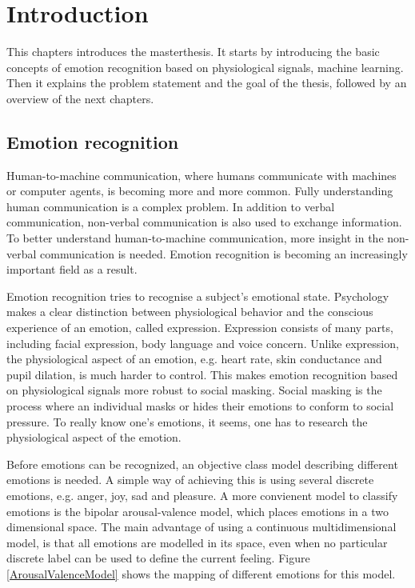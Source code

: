 \chapter{Introduction}
{\samenvatting This chapters introduces the masterthesis. It starts by introducing the basic concepts of emotion recognition based on physiological signals, machine learning. Then it explains the problem statement and the goal of the thesis, followed by an overview of the next chapters.}

\section{Emotion recognition}

Human-to-machine communication, where humans communicate with machines or computer agents, is becoming more and more common\citep{hummaccom}. Fully understanding human communication is a complex problem. In addition to verbal communication, non-verbal communication is also used to exchange information\citep{EmotionRelativePower}. To better understand human-to-machine communication, more insight in the non-verbal communication is needed. Emotion recognition is becoming an increasingly important field as a result\citep{RealTimeEEGEmotion}.

\npar 

Emotion recognition tries to recognise a subject's emotional state. Psychology makes a clear distinction between physiological behavior and the conscious experience of an emotion, called expression\cite{ExtendedPaper}. Expression consists of many parts, including facial expression, body language and voice concern\citep{EMSpeech}. Unlike expression, the physiological aspect of an emotion, e.g. heart rate, skin conductance and pupil dilation, is much harder to control. This makes emotion recognition based on physiological signals more robust to social masking\citep{PhytoEm}. Social masking is the process where an individual masks or hides their emotions to conform to social pressure. To really know one's emotions, it seems, one has to research the physiological aspect of the emotion.

\npar

\label{valarrdomspace}
Before emotions can be recognized, an objective class model describing different emotions is needed. A simple way of achieving this is using several discrete emotions, e.g. anger, joy, sad and pleasure. A more convienent model to classify emotions is the bipolar arousal-valence model\cite{ExtendedPaper,RealTimeEEGEmotion}, which places emotions in a two dimensional space. The main advantage of using a continuous multidimensional model, is that all emotions are modelled in its space, even when no particular discrete label can be used to define the current feeling. Figure \ref{ArousalValenceModel} shows the mapping of different emotions for this model. 

